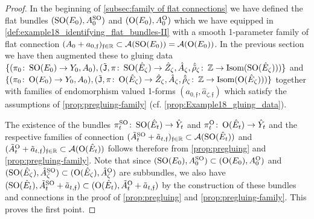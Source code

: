 \documentclass[11pt,a4paper]{scrartcl}
\newcommand{\col}{\colon \thinspace}
\newcommand{\SO}{\textup{SO}}
\renewcommand{\O}{\textup{O}}
\numberwithin{equation}{section}
\theoremstyle{plain}
\theoremstyle{definition}
\theoremstyle{remark}
\begin{document}
\begin{proof}
In the beginning of \autoref{subsec:family of flat connections} we have defined the flat bundles $(\SO(E_{0}),A_{0}^{\SO})$ and $(\O(E_{0}),A_{0}^{\O})$ which we have equipped in \autoref{def:example18_identifying_flat_bundles-II} with a smooth 1-parameter family of flat connection $(A_0+a_{0,\mathfrak{f}})_{\mathfrak{f}\in \mathbb{R}} \subset \mathcal{A}(\SO(E_0))=\mathcal{A}(\O(E_0))$. In the previous section we have then augmented these to gluing data $\{(\pi_0\col \SO(E_{0})\to Y_0,A_0),(\tilde{\mathtt{J}},\pi\col \SO(\hat{E}_\zeta) \to \hat{Z}_\zeta,\hat{A}_\zeta,\hat{\tilde{\rho}}_\zeta\col \mathbb{Z}\to \textup{Isom}(\SO(\hat{E}_\zeta)))\}$ and $\{(\pi_0 \col \O(E_0)\to Y_0, A_0),(\tilde{\mathtt{J}},\pi\col \O(\hat{E}_\zeta) \to \hat{Z}_\zeta,\hat{A}_\zeta,\hat{\tilde{\rho}}_\zeta\col \mathbb{Z}\to \textup{Isom}(\O(\hat{E}_\zeta)))\}$ together with families of endomorphism valued 1-forms $(a_{0,\mathfrak{f}},\hat{a}_{\zeta,\mathfrak{f}})$ which satisfy the assumptions of \autoref{prop:pregluing-family} (cf. \autoref{prop:Example18_gluing_data}). 

The existence of the bundles $\pi_{t}^{\SO} \col \SO(\hat{E}_{t}) \to \hat{Y}_t$ and $\pi_{t}^{\O} \col \O(\hat{E}_{t}) \to \hat{Y}_t$ and the respective families of connection $(\tilde{A}_t^\SO + \tilde{a}_{t,\mathfrak{f}})_{\mathfrak{f}\in \mathbb{R}} \subset \mathcal{A}(\SO(\hat{E}_t))$ and $(\tilde{A}_t^\O + \tilde{a}_{t,\mathfrak{f}})_{\mathfrak{f}\in \mathbb{R}} \subset \mathcal{A}(\O(\hat{E}_t))$ follows therefore from \autoref{prop:pregluing} and \autoref{prop:pregluing-family}. Note that since $(\SO(E_{0}),A_{0}^{\SO})\subset (\O(E_{0}),A_{0}^{\O})$ and $(\SO(\hat{E}_\zeta),\hat{A}_\zeta^{\SO})\subset (\O(\hat{E}_\zeta),\hat{A}_\zeta^{\O})$ are subbundles, we also have $(\SO(\hat{E}_{t}),\tilde{A}_{t}^{\SO} + \tilde{a}_{t,\mathfrak{f}})\subset (\O(\hat{E}_{t}),\tilde{A}_{t}^{\O}+\tilde{a}_{t,\mathfrak{f}})$ by the construction of these bundles and connections in the proof of \autoref{prop:pregluing} and \autoref{prop:pregluing-family}. This proves the first point.


\end{proof}
\end{document}
